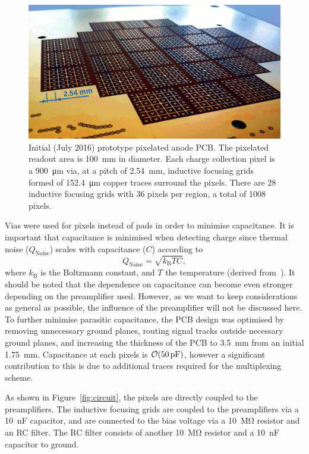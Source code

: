 \documentclass[instruments,article,submit,moreauthors,pdftex]{Definitions/mdpi}
\begin{document}
\begin{figure}[!ht]
	\centering
	\includegraphics[width=0.65\linewidth]{Figures/pixies.jpg}
	\caption{Initial (July 2016) prototype pixelated anode PCB. The pixelated readout area is \SI{100}{\milli\metre} in diameter.
		Each charge collection pixel is a \SI{900}{\micro\metre} via, at a pitch of \SI{2.54}{\milli\metre}, inductive focusing grids formed of \SI{152.4}{\micro\metre} copper traces surround the pixels. There are 28 inductive focusing grids with 36 pixels per region, a total of 1008 pixels.}
	\label{fig:pixies}
\end{figure}

Vias were used for pixels instead of pads in order to minimise capacitance.
It is important that capacitance is minimised when detecting charge since thermal noise ($Q_{\mathrm{Noise}}$) scales with capacitance ($C$) according to
\begin{equation}
	Q_{\mathrm{Noise}} = \sqrt{k_{\mathrm{B}}TC} \mathrm{,}
\end{equation}
where $k_{\mathrm{B}}$ is the Boltzmann constant, and $T$ the temperature (derived from~\cite{noise}).
It should be noted that the dependence on capacitance can become even stronger depending on the preamplifier used.
However, as we want to keep considerations as general as possible, the influence of the preamplifier will not be discussed here.
To further minimise parasitic capacitance, the PCB design was optimised by removing unnecessary ground planes, routing signal tracks outside necessary ground planes, and increasing the thickness of the PCB to \SI{3.5}{\milli\metre} from an initial \SI{1.75}{\milli\metre}. 
Capacitance at each pixels is $\order{\SI{50}{\pico\farad}}$, however a significant contribution to this is due to additional traces required for the multiplexing scheme.

As shown in Figure~\ref{fig:circuit}, the pixels are directly coupled to the preamplifiers.
The inductive focusing grids are coupled to the preamplifiers via a \SI{10}{\nano\farad} capacitor, and are connected to the bias voltage via a \SI{10}{\mega\ohm} resistor and an RC filter. 
The RC filter consists of another \SI{10}{\mega\ohm} resistor and a \SI{10}{\nano\farad} capacitor to ground.   
\end{document}
